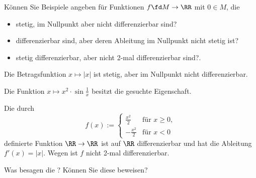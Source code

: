 \begin{frage}
Können Sie Beispiele angeben für Funktionen $f\fd M\to \RR$ mit 
$0\in M$, die 
\begin{itemize}[4mm]
\item[\desc{a}] stetig, im Nullpunkt aber nicht differenzierbar sind?\\[-3.5mm]
\item[\desc{b}] differenzierbar sind, aber deren Ableitung im Nullpunkt 
nicht stetig ist? \\[-3.5mm]
\item[\desc{c}] stetig differenzierbar, aber nicht 2-mal differenzierbar 
sind?.
\end{itemize}
\end{frage}

\begin{antwort}
 Die Betragsfunktion $x\mapsto |x|$ ist stetig, aber im 
Nullpunkt nicht differenzierbar.

\medskip

\noindent
{} Die Funktion $x\mapsto x^2 \cdot \sin\frac{1}{x}$ 
besitzt die gesuchte Eigenschaft.

\medskip
\noindent
{} Die durch 
\[
f(x) := \left\{ \begin{array}{rl} 
\frac{x^2}{2} & \text{für $x\ge 0$}, \\ 
-\frac{x^2}{2} & \text{für $x < 0$} 
\end{array} \right.
\]
definierte Funktion $\RR\to\RR$ ist auf $\RR$ differenzierbar und 
hat die Ableitung $f'(x)=|x|$. Wegen  
ist $f$ nicht 2-mal differenzierbar.
\AntEnd
\end{antwort}

\begin{frage}\label{06_algd}
Was besagen die ? 
Können Sie diese beweisen?
\end{frage}

